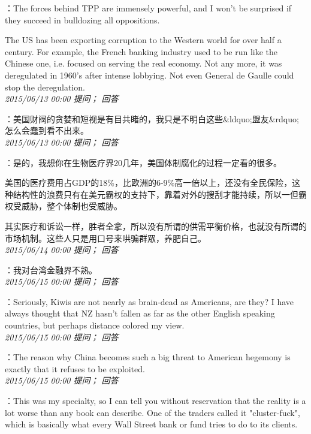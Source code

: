 \documentclass[twocolumn]{ctexart}
\begin{document}
：The forces behind TPP are immensely powerful, and I won't be surprised if they succeed in bulldozing all oppositions.

The US has been exporting corruption to the Western world for over half a century. For example, the French banking industry used to be run like the Chinese one, i.e. focused on serving the real economy. Not any more, it was deregulated in 1960's after intense lobbying. Not even General de Gaulle could stop the deregulation.\\

\textit{\hfill\noindent\small 2015/06/13 00:00 提问； 回答}

：美国财阀的贪婪和短视是有目共睹的，我只是不明白这些\&ldquo;盟友\&rdquo;怎么会蠢到看不出来。\\

\textit{\hfill\noindent\small 2015/06/13 00:00 提问； 回答}

：是的，我想你在生物医疗界20几年，美国体制腐化的过程一定看的很多。

美国的医疗费用占GDP的18\%，比欧洲的6-9\%高一倍以上，还没有全民保险，这种结构性的浪费只有在美元霸权的支持下，靠着对外的搜刮才能持续，所以一但霸权受威胁，整个体制也受威胁。

其实医疗和诉讼一样，胜者全拿，所以没有所谓的供需平衡价格，也就没有所谓的市场机制。这些人只是用口号来哄骗群眾，养肥自己。\\

\textit{\hfill\noindent\small 2015/06/14 00:00 提问； 回答}

：我对台湾金融界不熟。\\

\textit{\hfill\noindent\small 2015/06/15 00:00 提问； 回答}

：Seriously, Kiwis are not nearly as brain-dead as Americans, are they? I have always thought that NZ hasn't fallen as far as the other English speaking countries, but perhaps distance colored my view.\\

\textit{\hfill\noindent\small 2015/06/15 00:00 提问； 回答}

：The reason why China becomes such a big threat to American hegemony is exactly that it refuses to be exploited.\\

\textit{\hfill\noindent\small 2015/06/15 00:00 提问； 回答}

：This was my specialty, so I can tell you without reservation that the reality is a lot worse than any book can describe. One of the traders called it "cluster-fuck", which is basically what every Wall Street bank or fund tries to do to its clients.\\
\end{document}
